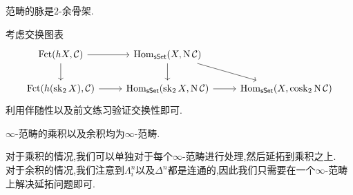 \begin{exercise}
    范畴的脉是$2$-余骨架.
\end{exercise}
\begin{solution}
    考虑交换图表
    \[\begin{tikzcd}
	{\Fct(hX,\mathcal{C})} & {\Hom_{\cate{sSet}}(X,\nerve\mathcal{C})} \\
	{\Fct(h(\sk_2X),\mathcal{C})} & {\Hom_{\cate{sSet}}(\sk_2X,\nerve\mathcal{C})} & {\Hom_{\cate{sSet}}(X,\cosk_2\nerve\mathcal{C})}
	\arrow[from=1-1, to=1-2]
	\arrow[from=1-1, to=2-1]
	\arrow[from=1-2, to=2-2]
	\arrow[from=1-2, to=2-3]
	\arrow[from=2-1, to=2-2]
	\arrow[from=2-2, to=2-3]
    \end{tikzcd}\]
    利用伴随性以及前文练习验证交换性即可.
\end{solution}
\begin{exercise}
    $\infty$-范畴的乘积以及余积均为$\infty$-范畴.
\end{exercise}
\begin{solution}
    对于乘积的情况,我们可以单独对于每个$\infty$-范畴进行处理,然后延拓到乘积之上.\\
    对于余积的情况,我们注意到$\Lambda_i^n$以及$\Delta^n$都是连通的,因此我们只需要在一个$\infty$-范畴上解决延拓问题即可.
\end{solution}
